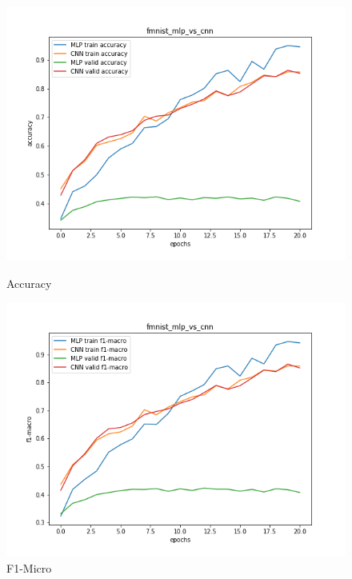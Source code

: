\documentclass{article}
\begin{document}
\begin{figure}[!htb]
	\includegraphics[width=\linewidth]{../output_plots/FMNIST/task-7/fmnist-mlp-vs-cnn-Accuracy-accuracy.png}
	\caption{Accuracy}\label{fig:part_1_task_7_accuracy}
	\endminipage\hfill
	\includegraphics[width=\linewidth]{../output_plots/FMNIST/task-7/fmnist-mlp-vs-cnn-F1-Macro-score-f1-macro.png}
	\caption{F1-Micro}\label{fig:part_1_task_7_f1-micro}
	\endminipage

\end{figure}
\end{document}

